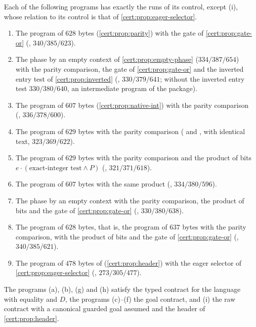 \begin{proposition}[Compositions]\label{cert:prop:late-compositions}
Each of the following programs has exactly the runs of its control, except
(i), whose relation to its control is that of \cref{cert:prop:eager-selector}.
\begin{enumerate}[label=(\alph*)]
\item The program of $628$ bytes (\cref{cert:prop:parity}) with the gate of
\cref{cert:prop:gate-or} (, $340/385/623$).
\item The phase by an empty context of \cref{cert:prop:empty-phase}
($334/387/654$) with the parity comparison, the gate of
\cref{cert:prop:gate-or} and the inverted entry test of
\cref{cert:prop:inverted} (, $330/379/641$; without the
inverted entry test $330/380/640$, an intermediate program of the package).
\item The program of $607$ bytes (\cref{cert:prop:native-int}) with the parity
comparison (, $336/378/600$).
\item The program of $629$ bytes with the parity comparison
( and , with identical text,
$323/369/622$).
\item The program of $629$ bytes with the parity comparison and the product of
bits $e\cdot(\text{exact-integer test}\land P)$ (,
$321/371/618$).
\item The program of $607$ bytes with the same product (,
$334/380/596$).
\item The phase by an empty context with the parity comparison, the product of
bits and the gate of \cref{cert:prop:gate-or} (,
$330/380/638$).
\item The program of $628$ bytes, that is, the program of $637$ bytes with the
parity comparison, with the product of bits and the gate of
\cref{cert:prop:gate-or} (, $340/385/621$).
\item The program of $478$ bytes of 
(\cref{cert:prop:header}) with the eager selector of
\cref{cert:prop:eager-selector} (, $273/305/477$).
\end{enumerate}
The programs (a), (b), (g) and (h) satisfy the typed contract for the language
with equality and $D$, the programs (c)--(f) the goal contract, and (i) the
raw contract with a canonical guarded goal assumed and the header of
\cref{cert:prop:header}.
\end{proposition}
